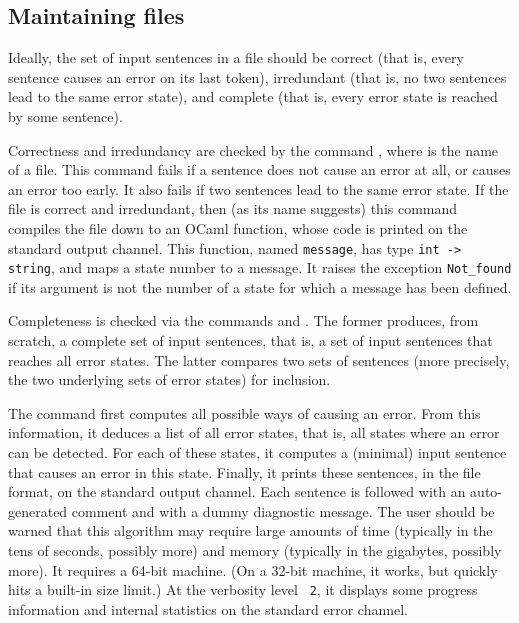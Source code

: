 \documentclass[onecolumn,11pt,nocopyrightspace,preprint]{sigplanconf}
\begin{document}

\subsection{Maintaining \messages files}
\label{sec:messages:tools}

Ideally, the set of input sentences in a \messages file should be correct
(that is, every sentence causes an error on its last token), irredundant (that
is, no two sentences lead to the same error state), and complete (that is,
every error state is reached by some sentence).

Correctness and irredundancy are checked by the
command \ocompileerrors {}, where  is the name of
a \messages file. This command fails if a sentence does not cause an error at
all, or causes an error too early. It also fails if two sentences lead to the
same error state.
%
If the file is correct and irredundant, then (as its name suggests) this
command compiles the \messages file down to an OCaml function, whose code
is printed on the standard output channel. This function, named \verb+message+,
has type \verb+int -> string+, and maps a state number to a message. It
raises the exception \verb+Not_found+ if its argument is not the number of
a state for which a message has been defined.

Completeness is checked via the commands \olisterrors and
\ocompareerrors. The former produces, from scratch, a complete
set of input sentences, that is, a set of input sentences that reaches all
error states. The latter compares two sets of sentences (more precisely,
the two underlying sets of error states) for inclusion.

The command \olisterrors first computes all possible ways of causing an error.
From this information, it deduces a list of all error states, that is, all
states where an error can be detected. For each of these states, it computes a
(minimal) input sentence that causes an error in this state. Finally, it
prints these sentences, in the \messages file format, on the standard output
channel. Each sentence is followed with an auto-generated comment and with a
dummy diagnostic message. The user should be warned that this algorithm may
require large amounts of time (typically in the tens of seconds, possibly
more) and memory (typically in the gigabytes, possibly more). It requires a
64-bit machine. (On a 32-bit machine, it works, but quickly hits a built-in
size limit.) At the verbosity level \ologautomaton~\texttt{2}, it displays
some progress information and internal statistics on the standard error
channel.
\end{document}
